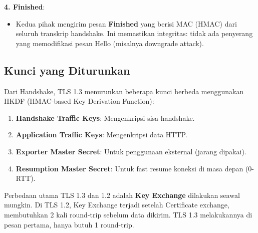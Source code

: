 \textbf{4. Finished}:
\begin{itemize}
  \item Kedua pihak mengirim pesan \textbf{Finished} yang berisi MAC (HMAC) dari seluruh transkrip handshake. Ini memastikan integritas: tidak ada penyerang yang memodifikasi pesan Hello (misalnya downgrade attack).
\end{itemize}

\subsection{Kunci yang Diturunkan}

Dari Handshake, TLS 1.3 menurunkan beberapa kunci berbeda menggunakan HKDF (HMAC-based Key Derivation Function):

\begin{enumerate}
  \item \textbf{Handshake Traffic Keys}: Mengenkripsi sisa handshake.
  \item \textbf{Application Traffic Keys}: Mengenkripsi data HTTP.
  \item \textbf{Exporter Master Secret}: Untuk penggunaan eksternal (jarang dipakai).
  \item \textbf{Resumption Master Secret}: Untuk fast resume koneksi di masa depan (0-RTT).
\end{enumerate}

\begin{konsep}
Perbedaan utama TLS 1.3 dan 1.2 adalah \textbf{Key Exchange} dilakukan seawal mungkin. Di TLS 1.2, Key Exchange terjadi setelah Certificate exchange, membutuhkan 2 kali round-trip sebelum data dikirim. TLS 1.3 melakukannya di pesan pertama, hanya butuh 1 round-trip.
\end{konsep}
